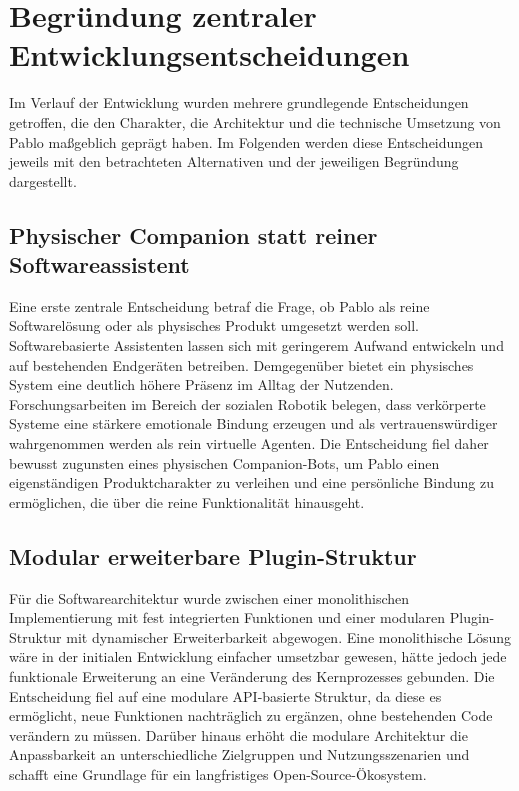 \section{Begründung zentraler Entwicklungsentscheidungen}

Im Verlauf der Entwicklung wurden mehrere grundlegende Entscheidungen getroffen, die den Charakter, die Architektur und die technische Umsetzung von Pablo maßgeblich geprägt haben.
Im Folgenden werden diese Entscheidungen jeweils mit den betrachteten Alternativen und der jeweiligen Begründung dargestellt.

\subsection{Physischer Companion statt reiner Softwareassistent}

Eine erste zentrale Entscheidung betraf die Frage, ob Pablo als reine Softwarelösung oder als physisches Produkt umgesetzt werden soll.
Softwarebasierte Assistenten lassen sich mit geringerem Aufwand entwickeln und auf bestehenden Endgeräten betreiben.
Demgegenüber bietet ein physisches System eine deutlich höhere Präsenz im Alltag der Nutzenden.
Forschungsarbeiten im Bereich der sozialen Robotik belegen, dass verkörperte Systeme eine stärkere emotionale Bindung erzeugen und als vertrauenswürdiger wahrgenommen werden als rein virtuelle Agenten.
Die Entscheidung fiel daher bewusst zugunsten eines physischen Companion-Bots, um Pablo einen eigenständigen Produktcharakter zu verleihen und eine persönliche Bindung zu ermöglichen, die über die reine Funktionalität hinausgeht.

\subsection{Modular erweiterbare Plugin-Struktur}

Für die Softwarearchitektur wurde zwischen einer monolithischen Implementierung mit fest integrierten Funktionen und einer modularen Plugin-Struktur mit dynamischer Erweiterbarkeit abgewogen.
Eine monolithische Lösung wäre in der initialen Entwicklung einfacher umsetzbar gewesen, hätte jedoch jede funktionale Erweiterung an eine Veränderung des Kernprozesses gebunden.
Die Entscheidung fiel auf eine modulare API-basierte Struktur, da diese es ermöglicht, neue Funktionen nachträglich zu ergänzen, ohne bestehenden Code verändern zu müssen.
Darüber hinaus erhöht die modulare Architektur die Anpassbarkeit an unterschiedliche Zielgruppen und Nutzungsszenarien und schafft eine Grundlage für ein langfristiges Open-Source-Ökosystem.

